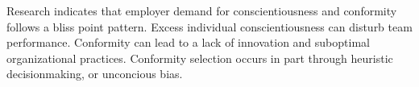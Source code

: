 \documentclass[review]{elsarticle}
\begin{document}



Research indicates that employer demand for conscientiousness and conformity follows a bliss point pattern.
Excess individual conscientiousness can disturb team performance\cite{curcseu2019personality}.
Conformity can lead to a lack of innovation and suboptimal organizational practices\cite{symon2006neglected}.
Conformity selection occurs in part through heuristic decisionmaking, or unconcious bias.

\end{document}
